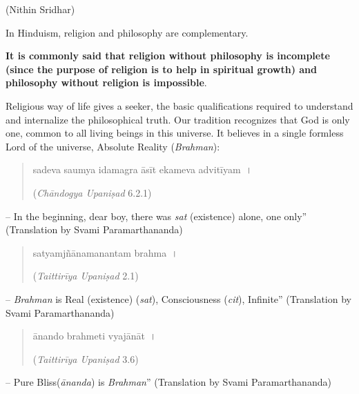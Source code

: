 \begin{flushright}
(Nithin Sridhar)
\end{flushright}

In Hinduism, religion and philosophy are complementary.

\textbf{It is commonly said that religion without philosophy is incomplete (since the purpose of religion is to help in spiritual growth) and philosophy without religion is impossible}.

Religious way of life gives a seeker, the basic qualifications required to understand and internalize the philosophical truth. Our tradition recognizes that God is only one, common to all living beings in this universe. It believes in a single formless Lord of the universe, Absolute Reality (\textit{Brahman}):

\begin{verse}
sadeva saumya idamagra āsīt ekameva advitīyam~। 
\begin{flushright}
(\textit{Chāndogya Upaniṣad} 6.2.1)
\end{flushright}
\end{verse}

\begin{myquote}
– In the beginning, dear boy, there was \textit{sat} (existence) alone, one only” (Translation by Svami Paramarthananda)
\end{myquote}

\begin{verse}
satyamjñānamanantam brahma~। 
\begin{flushright}
(\textit{Taittirīya Upaniṣad} 2.1)
\end{flushright}
\end{verse}

\begin{myquote}
– \textit{Brahman} is Real (existence) (\textit{sat}), Consciousness (\textit{cit}), Infinite” (Translation by Svami Paramarthananda)
\end{myquote}

\begin{verse}
ānando brahmeti vyajānāt~। 
\begin{flushright}
(\textit{Taittirīya Upaniṣad} 3.6)
\end{flushright}
\end{verse}

\begin{myquote}
– Pure Bliss(\textit{ānanda}) is \textit{Brahman}” (Translation by Svami Paramarthananda)
\end{myquote}

